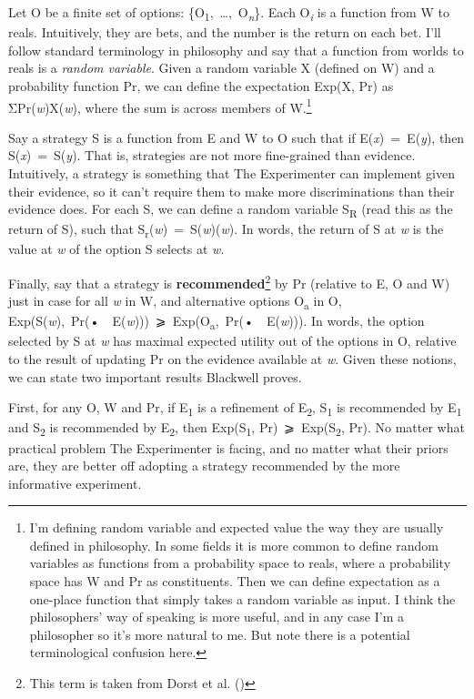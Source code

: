 \documentclass[
  11pt,
  letterpaper,
  DIV=11,
  numbers=noendperiod,
  twoside]{scrartcl}
\begin{document}
Let O be a finite set of options:
\{O\textsubscript{1},~\ldots,~O\textsubscript{\emph{n}}\}. Each
O\textsubscript{\emph{i}} is a function from W to reals. Intuitively,
they are bets, and the number is the return on each bet. I'll follow
standard terminology in philosophy and say that a function from worlds
to reals is a \emph{random variable}. Given a random variable X (defined
on W) and a probability function Pr, we can define the expectation
Exp(X, Pr) as ΣPr(\emph{w})X(\emph{w}), where the sum is across members
of W.\footnote{I'm defining random variable and expected value the way
  they are usually defined in philosophy. In some fields it is more
  common to define random variables as functions from a probability
  space to reals, where a probability space has W and Pr as
  constituents. Then we can define expectation as a one-place function
  that simply takes a random variable as input. I think the
  philosophers' way of speaking is more useful, and in any case I'm a
  philosopher so it's more natural to me. But note there is a potential
  terminological confusion here.}

Say a strategy S is a function from E and W to O such that if
E(\emph{x})~=~E(\emph{y}), then S(\emph{x})~=~S(\emph{y}). That is,
strategies are not more fine-grained than evidence. Intuitively, a
strategy is something that The Experimenter can implement given their
evidence, so it can't require them to make more discriminations than
their evidence does. For each S, we can define a random variable
S\textsubscript{R} (read this as the return of S), such that
S\textsubscript{r}(\emph{w})~=~S(\emph{w})(\emph{w}). In words, the
return of S at \emph{w} is the value at \emph{w} of the option S selects
at \emph{w}.

Finally, say that a strategy is \textbf{recommended}\footnote{This term
  is taken from Dorst et al. ()} by Pr
(relative to E, O and W) just in case for all \emph{w} in W, and
alternative options O\textsubscript{a} in O,
Exp(S(\emph{w}),~Pr(•~\textbar~E(\emph{w})))~⩾~Exp(O\textsubscript{a},~Pr(•~\textbar~E(\emph{w}))).
In words, the option selected by S at \emph{w} has maximal expected
utility out of the options in O, relative to the result of updating Pr
on the evidence available at \emph{w}. Given these notions, we can state
two important results Blackwell proves.

First, for any O, W and Pr, if E\textsubscript{1} is a refinement of
E\textsubscript{2}, S\textsubscript{1} is recommended by
E\textsubscript{1} and S\textsubscript{2} is recommended by
E\textsubscript{2}, then Exp(S\textsubscript{1},
Pr)~⩾~Exp(S\textsubscript{2}, Pr). No matter what practical problem The
Experimenter is facing, and no matter what their priors are, they are
better off adopting a strategy recommended by the more informative
experiment.
\end{document}
